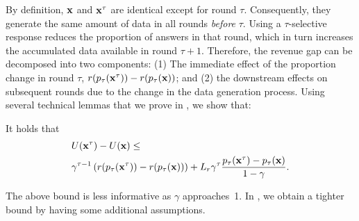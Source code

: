 By definition, ${\bf{x}}$ and ${\bf{x}}^\tau$ are identical except for round $\tau$. Consequently, they generate the same amount of data in all rounds \emph{before} $\tau$. Using a $\tau$-selective response reduces the proportion of answers in that round, which in turn increases the accumulated data available in round $\tau + 1$. Therefore, the revenue gap can be decomposed into two components: (1) The immediate effect of the proportion change in round $\tau$, $r(p_\tau({\bf{x}}^\tau)) - r(p_\tau({\bf{x}}))$; and (2) the downstream effects on subsequent rounds due to the change in the data generation process. Using several technical lemmas that we prove in , we show that:
\begin{corollary}\label{cor: loose bound}
It holds that
\begin{align*}
&U({\bf{x}}^\tau) - U({\bf{x}}) \leq \\
&\gamma^{\tau - 1} \left( r(p_\tau({\bf{x}}^\tau)) - r(p_\tau({\bf{x}})) \right) + L_r \gamma^{\tau} \frac{p_\tau({\bf{x}}^\tau) - p_\tau({\bf{x}})}{1 - \gamma}.
\end{align*}
\end{corollary}
The above bound is less informative as $\gamma$ approaches~1. In , we obtain a tighter bound by having some additional assumptions.



